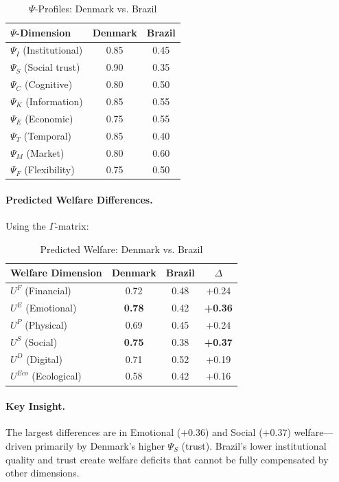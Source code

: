 \begin{table}[htbp]
\centering
\caption{$\Psi$-Profiles: Denmark vs. Brazil}
\label{tab:denmark-brazil-psi}
\renewcommand{\arraystretch}{1.3}
\begin{tabular}{@{}lcc@{}}
\toprule
\textbf{$\Psi$-Dimension} & \textbf{Denmark} & \textbf{Brazil} \\
\midrule
$\Psi_I$ (Institutional) & 0.85 & 0.45 \\
$\Psi_S$ (Social trust) & 0.90 & 0.35 \\
$\Psi_C$ (Cognitive) & 0.80 & 0.50 \\
$\Psi_K$ (Information) & 0.85 & 0.55 \\
$\Psi_E$ (Economic) & 0.75 & 0.55 \\
$\Psi_T$ (Temporal) & 0.85 & 0.40 \\
$\Psi_M$ (Market) & 0.80 & 0.60 \\
$\Psi_F$ (Flexibility) & 0.75 & 0.50 \\
\bottomrule
\end{tabular}
\end{table}

\paragraph{Predicted Welfare Differences.}
Using the $\Gamma$-matrix:

\begin{table}[htbp]
\centering
\caption{Predicted Welfare: Denmark vs. Brazil}
\label{tab:denmark-brazil-welfare}
\renewcommand{\arraystretch}{1.3}
\begin{tabular}{@{}lccc@{}}
\toprule
\textbf{Welfare Dimension} & \textbf{Denmark} & \textbf{Brazil} & \textbf{$\Delta$} \\
\midrule
$U^F$ (Financial) & 0.72 & 0.48 & +0.24 \\
$U^E$ (Emotional) & \textbf{0.78} & 0.42 & \textbf{+0.36} \\
$U^P$ (Physical) & 0.69 & 0.45 & +0.24 \\
$U^S$ (Social) & \textbf{0.75} & 0.38 & \textbf{+0.37} \\
$U^D$ (Digital) & 0.71 & 0.52 & +0.19 \\
$U^{Eco}$ (Ecological) & 0.58 & 0.42 & +0.16 \\
\bottomrule
\end{tabular}
\end{table}

\paragraph{Key Insight.}
The largest differences are in Emotional ($+0.36$) and Social ($+0.37$) welfare---driven 
primarily by Denmark's higher $\Psi_S$ (trust). Brazil's lower institutional quality 
and trust create welfare deficits that cannot be fully compensated by other dimensions.

